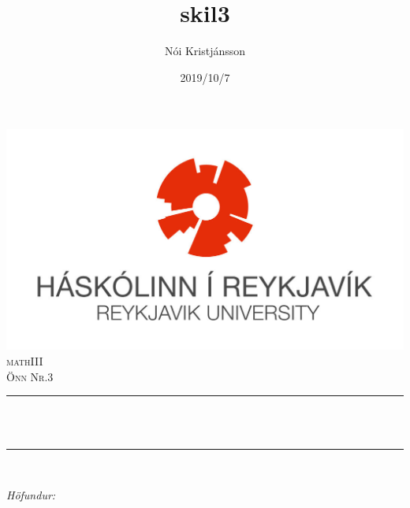 \documentclass[12pt]{article}
\title{skil3}
\author{Nói Kristjánsson}
\date{2019/10/7}
\makeatletter
\let\thetitle\@title
\let\theauthor\@author
\let\thedate\@date
\makeatother
\begin{document}

\begin{titlepage}
    \centering
    \vspace*{0.5 cm}
    \includegraphics[scale = 1.15]{HR_logo_midjad_hires.jpg}\\[1.0 cm]	%
    \textsc{\Large mathIII}\\[0.5 cm]				%
    \textsc{\large Önn Nr.3}\\[0.5 cm]				%
    \rule{\linewidth}{0.2 mm} \\[0.4 cm]
    { \huge \bfseries \thetitle}\\
    \rule{\linewidth}{0.2 mm} \\[1.5 cm]
    
    \begin{minipage}{0.4\textwidth}
        \begin{flushleft} \large
            \emph{Höfundur:}\\
            \theauthor
            \end{flushleft}
            \end{minipage}~
            \begin{minipage}{0.4\textwidth}
            \begin{flushright} \large
        \end{flushright}
    \end{minipage}\\[2 cm]
    
    {\large \thedate}\\[2 cm]

    \vfill
    
\end{titlepage}


\end{document}
